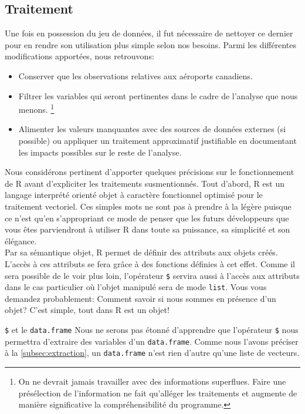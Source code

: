 \subsection{Traitement}
\label{subsec:Traitement}

Une fois en possession du jeu de données, il fut nécessaire de nettoyer ce dernier pour en rendre son utilisation plus simple selon nos besoins. Parmi les différentes modifications apportées, nous retrouvons: \\
\begin{itemize}
	\item Conserver que les observations relatives aux aéroports canadiens.
	\item Filtrer les variables qui seront pertinentes dans le cadre de l'analyse que nous menons. 
		\footnote{On ne devrait jamais travailler avec des informations superflues. Faire une présélection de l'information ne fait qu'alléger les traitements et augmente de manière significative la compréhensibilité du programme.}
	\item Alimenter les valeurs manquantes avec des sources de données externes (si possible) ou appliquer un traitement approximatif justifiable en documentant les impacts possibles sur le reste de l'analyse.
\end{itemize}
\vspace{\baselineskip}

Nous considérons pertinent d'apporter quelques précisions sur le fonctionnement de R avant d'expliciter les traitements susmentionnés. Tout d'abord, R est un langage interprété orienté objet à caractère fonctionnel optimisé pour le traitement vectoriel. Ces simples mots ne sont pas à prendre à la légère puisque ce n'est qu'en s'appropriant ce mode de penser que les futurs développeurs que vous êtes parviendront à utiliser R dans toute sa puissance, sa simplicité et son élégance. \\

Par sa sémantique objet, R permet de définir des attributs aux objets créés. L'accès à ces attributs se fera grâce à des fonctions définies à cet effet. Comme il sera possible de le voir plus loin, l'opérateur \texttt{\$} servira aussi à l'accès aux attributs dans le cas particulier où l'objet manipulé sera de mode \texttt{list}.
Vous vous demandez probablement: Comment savoir si nous sommes en présence d'un objet? C'est simple, tout dans R est un objet! \\

\begin{moreInfo}{\texttt{\$} et le \texttt{data.frame}}
	Nous ne serons pas étonné d'apprendre que l'opérateur \texttt{\$} nous permettra d'extraire des variables d'un \texttt{data.frame}. Comme nous l'avons préciser à la \autoref{subsec:extraction}, un \texttt{data.frame} n'est rien d'autre qu'une liste de vecteurs.
\end{moreInfo}

